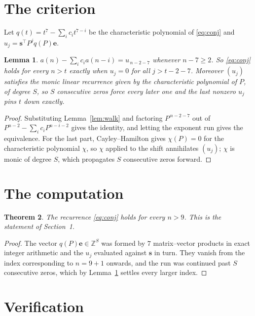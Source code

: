 \documentclass[11pt,a4paper]{article}
\theoremstyle{plain}
\newtheorem{theorem}{Theorem}
\newtheorem{lemma}[theorem]{Lemma}
\theoremstyle{definition}
\begin{document}
\section{The criterion}

Let $q(t)=t^{7}-\sum_i c_i t^{7-i}$ be the characteristic polynomial of
\eqref{eq:conj} and $u_j=\mathbf{s}^{\!\top}P^{j}q(P)\mathbf{e}$.

\begin{lemma}\label{lem:crit}
$a(n)-\sum_i c_i a(n-i)=u_{\,n-2-7}$ whenever $n-7\ge2$. So \eqref{eq:conj}
holds for every $n>t$ exactly when $u_j=0$ for all $j>t-2-7$. Moreover $(u_j)$
satisfies the monic linear recurrence given by the characteristic polynomial of $P$, of
degree $S$, so $S$ consecutive zeros force every later one and the last nonzero $u_j$ pins
$t$ down exactly.
\end{lemma}

\begin{proof}
Substituting Lemma~\ref{lem:walk} and factoring $P^{\,n-2-7}$ out of
$P^{n-2}-\sum_i c_i P^{n-i-2}$ gives the identity, and letting the exponent run gives the
equivalence. For the last part, Cayley--Hamilton gives $\chi(P)=0$ for the characteristic
polynomial $\chi$, so $\chi$ applied to the shift annihilates $(u_j)$; $\chi$ is monic of
degree $S$, which propagates $S$ consecutive zeros forward.
\end{proof}

\section{The computation}

\begin{theorem}
The recurrence \eqref{eq:conj} holds for every $n>9$. This is the statement of
Section~1.
\end{theorem}

\begin{proof}
The vector $q(P)\mathbf{e}\in\mathbb{Z}^{S}$ was formed by $7$ matrix--vector
products in exact integer arithmetic and the $u_j$ evaluated against $\mathbf{s}$ in turn.
They vanish from the index corresponding to $n=9+1$ onwards, and the run was continued
past $S$ consecutive zeros, which by Lemma~\ref{lem:crit} settles every larger index.
\end{proof}

\section{Verification}
\end{document}
